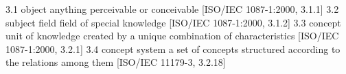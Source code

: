 \documentclass{article}
\begin{document}
3.1
object
anything perceivable or conceivable [ISO/IEC 1087-1:2000, 3.1.1]
3.2
subject field
field of special knowledge [ISO/IEC 1087-1:2000, 3.1.2]
3.3
concept
unit of knowledge created by a unique combination of characteristics [ISO/IEC 1087-1:2000, 3.2.1]
3.4
concept system
a set of concepts structured according to the relations among them [ISO/IEC 11179-3, 3.2.18]


\end{document}
